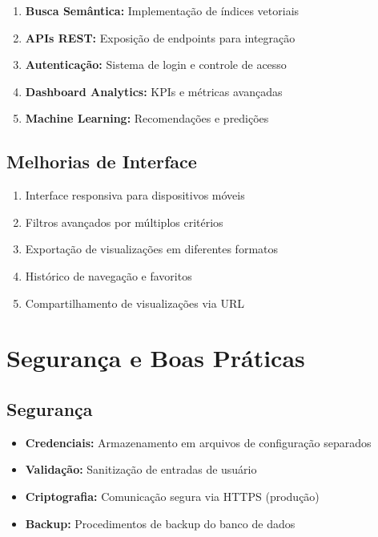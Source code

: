 \documentclass[12pt,a4paper]{article}
\begin{document}
\begin{enumerate}
    \item \textbf{Busca Semântica:} Implementação de índices vetoriais
    \item \textbf{APIs REST:} Exposição de endpoints para integração
    \item \textbf{Autenticação:} Sistema de login e controle de acesso
    \item \textbf{Dashboard Analytics:} KPIs e métricas avançadas
    \item \textbf{Machine Learning:} Recomendações e predições
\end{enumerate}

\subsection{Melhorias de Interface}

\begin{enumerate}
    \item Interface responsiva para dispositivos móveis
    \item Filtros avançados por múltiplos critérios
    \item Exportação de visualizações em diferentes formatos
    \item Histórico de navegação e favoritos
    \item Compartilhamento de visualizações via URL
\end{enumerate}

\section{Segurança e Boas Práticas}

\subsection{Segurança}

\begin{itemize}
    \item \textbf{Credenciais:} Armazenamento em arquivos de configuração separados
    \item \textbf{Validação:} Sanitização de entradas de usuário
    \item \textbf{Criptografia:} Comunicação segura via HTTPS (produção)
    \item \textbf{Backup:} Procedimentos de backup do banco de dados
\end{itemize}
\end{document}

